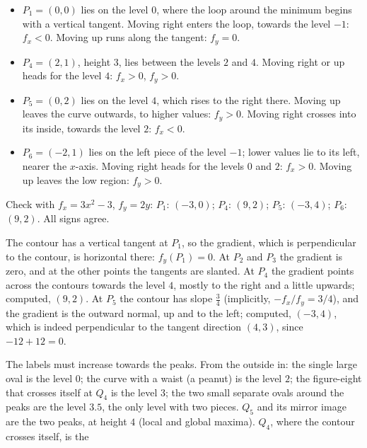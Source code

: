 \begin{solutions}
\begin{itemize}[leftmargin=1.2em,itemsep=0.2ex]
          \item $P_{1}=(0,0)$ lies on the level $0$, where the loop around
                the minimum begins with a vertical tangent. Moving right
                enters the loop, towards the level $-1$: $f_{x}<0$. Moving
                up runs along the tangent: $f_{y}=0$.
          \item $P_{4}=(2,1)$, height $3$, lies between the levels $2$ and
                $4$. Moving right or up heads for the level $4$:
                $f_{x}>0$, $f_{y}>0$.
          \item $P_{5}=(0,2)$ lies on the level $4$, which rises to the
                right there. Moving up leaves the curve outwards, to higher
                values: $f_{y}>0$. Moving right crosses into its inside,
                towards the level $2$: $f_{x}<0$.
          \item $P_{6}=(-2,1)$ lies on the left piece of the level $-1$;
                lower values lie to its left, nearer the $x$-axis. Moving
                right heads for the levels $0$ and $2$: $f_{x}>0$. Moving
                up leaves the low region: $f_{y}>0$.
        \end{itemize}
        Check with $f_{x}=3x^{2}-3$, $f_{y}=2y$: $P_{1}$: $(-3,0)$;
        $P_{4}$: $(9,2)$; $P_{5}$: $(-3,4)$; $P_{6}$: $(9,2)$. All signs
        agree.
  \item The contour has a vertical tangent at $P_{1}$, so the gradient,
        which is perpendicular to the contour, is horizontal there:
        $f_{y}(P_{1})=0$. At $P_{2}$ and $P_{3}$ the gradient is zero, and
        at the other points the tangents are slanted. At $P_{4}$ the
        gradient points across the contours towards the level $4$, mostly
        to the right and a little upwards; computed, $(9,2)$. At $P_{5}$ the
        contour has slope $\tfrac34$ (implicitly, $-f_{x}/f_{y}=3/4$), and
        the gradient is the outward normal, up and to the left; computed,
        $(-3,4)$, which is indeed perpendicular to the tangent direction
        $(4,3)$, since $-12+12=0$.
  \item The labels must increase towards the peaks. From the outside in:
        the single large oval is the level $0$; the curve with a waist (a
        peanut) is the level $2$; the figure-eight that crosses itself at
        $Q_{4}$ is the level $3$; the two small separate ovals around the
        peaks are the level $3.5$, the only level with two pieces. $Q_{5}$
        and its mirror image are the two peaks, at height $4$ (local and
        global maxima). $Q_{4}$, where the contour crosses itself, is the

\end{solutions}
